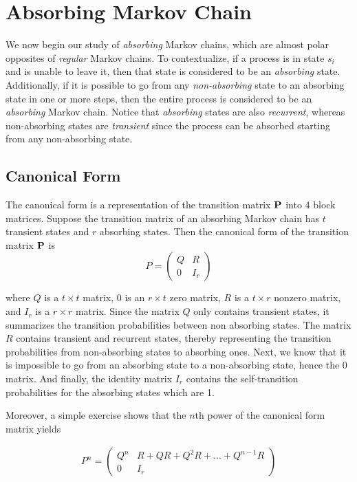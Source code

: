 \documentclass[a4paper,12pt]{article}
\theoremstyle{definition}
\let\oldtextbf\mathbf
\renewcommand{\mathbf}[1]{\oldtextbf{\boldmath #1}}
\begin{document}
\section*{Absorbing Markov Chain}

	We now begin our study of \emph{absorbing} Markov chains, which are almost polar opposites of \emph{regular} Markov chains. 
	To contextualize, if a process is in state $s_i$ and is unable to leave it, then that state is considered to be an \emph{absorbing} 
	state. Additionally, if it is possible to go from any \emph{non-absorbing} state to an absorbing state in one or more steps, then 
	the entire process is considered to be an \emph{absorbing} Markov chain. Notice that \emph{absorbing} states are also 
	\emph{recurrent}, whereas non-absorbing states are \emph{transient} since the process can be absorbed starting from any 
	non-absorbing state.	
	
	\subsection*{Canonical Form}
	
	The canonical form is a representation of the transition matrix $\mathbf{P}$ into 4 block matrices. Suppose the transition matrix 
	of an absorbing Markov chain has $t$ transient states and $r$ absorbing states. Then the canonical form of the 
	transition matrix $\mathbf{P}$ is
	 \[
    P = \left(
    \begin{array}{c|c}
      Q & R\\
      \hline
      0 & I_r
    \end{array}
    \right)
  \]
  
	where $Q$ is a $t \times t$ matrix, $0$ is an $r \times t$ zero matrix, $R$ is a $t \times r$ nonzero matrix, and $I_r$ is a 
	$r \times r$ matrix. Since the matrix $Q$ only contains transient states, it summarizes the transition probabilities 
	between non absorbing states. The matrix $R$ contains transient and recurrent states, thereby representing the transition 
	probabilities from non-absorbing states to absorbing ones. Next, we know that it is impossible to go from an absorbing state 
	to a non-absorbing state, hence the $0$ matrix. And finally, the identity matrix $I_r$ contains the self-transition 
	probabilities for the absorbing states which are 1.

Moreover, a simple exercise shows that the $n$th power of the canonical form matrix yields

	\begin{equation*}
	\begin{aligned}
		P^n = \left(
		\begin{array}{c|c}
		Q^n & R + QR + Q^2R + ... + Q^{n-1}R\\
		\hline
		0 & I_r
		\end{array}
    	\right)
	\end{aligned}
	\end{equation*}	
\end{document}

